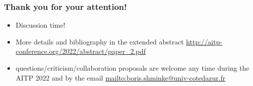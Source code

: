 \documentclass{beamer}
\begin{document}
\begin{frame}[t]
\frametitle{Thank you for your attention!}
\begin{itemize}
\item Discussion time!
\item More details and bibliography in the extended abstract \url{http://aitp-conference.org/2022/abstract/paper_2.pdf}
\item questions/criticism/collaboration proposals are welcome any time during the AITP 2022 and by the email \url{mailto:boris.shminke@univ-cotedazur.fr}
\end{itemize}
\end{frame}
\end{document}
